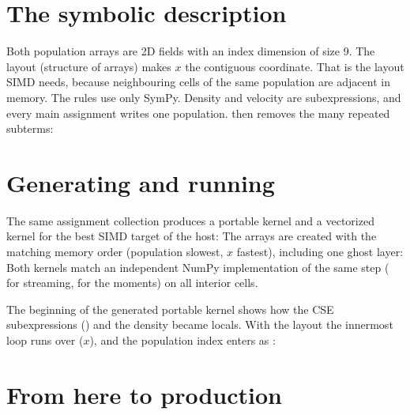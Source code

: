 \section{The symbolic description}

Both population arrays are 2D fields with an index dimension of size 9. The layout
 (structure of arrays) makes $x$ the contiguous coordinate. That is the layout
SIMD needs, because neighbouring cells of the same population are adjacent in memory.
The rules use only SymPy. Density and velocity are subexpressions, and every main
assignment writes one population.  then removes the many
repeated subterms:

\section{Generating and running}

The same assignment collection produces a portable kernel and a vectorized kernel for
the best SIMD target of the host:
The arrays are created with the matching memory order (population slowest, $x$
fastest), including one ghost layer:
Both kernels match an independent NumPy implementation of the same step
( for streaming,  for the moments) on all interior cells.

The beginning of the generated portable kernel shows how the CSE subexpressions
() and the density became  locals. With the  layout the
innermost loop runs over  ($x$), and the population index enters as
:

\section{From here to production}

